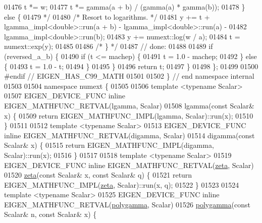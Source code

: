 \begin{DoxyCode}
01476 \textcolor{comment}{      t *= w;}
01477 \textcolor{comment}{      t *= gamma(a + b) / (gamma(a) * gamma(b));}
01478 \textcolor{comment}{    \} else \{}
01479 \textcolor{comment}{    */}
01480     \textcolor{comment}{/* Resort to logarithms.  */}
01481     y += t + lgamma\_impl<double>::run(a + b) - lgamma\_impl<double>::run(a) -
01482          lgamma\_impl<double>::run(b);
01483     y += numext::log(w / a);
01484     t = numext::exp(y);
01485 
01486     \textcolor{comment}{/* \} */}
01487     \textcolor{comment}{// done:}
01488 
01489     \textcolor{keywordflow}{if} (reversed\_a\_b) \{
01490       \textcolor{keywordflow}{if} (t <= machep) \{
01491         t = 1.0 - machep;
01492       \} \textcolor{keywordflow}{else} \{
01493         t = 1.0 - t;
01494       \}
01495     \}
01496     \textcolor{keywordflow}{return} t;
01497   \}
01498 \};
01499 
01500 \textcolor{preprocessor}{#endif  // EIGEN\_HAS\_C99\_MATH}
01501 
01502 \}  \textcolor{comment}{// end namespace internal}
01503 
01504 \textcolor{keyword}{namespace }numext \{
01505 
01506 \textcolor{keyword}{template} <\textcolor{keyword}{typename} Scalar>
01507 EIGEN\_DEVICE\_FUNC \textcolor{keyword}{inline} EIGEN\_MATHFUNC\_RETVAL(lgamma, Scalar)
01508     lgamma(\textcolor{keyword}{const} Scalar& x) \{
01509   \textcolor{keywordflow}{return} EIGEN\_MATHFUNC\_IMPL(lgamma, Scalar)::run(x);
01510 \}
01511 
01512 \textcolor{keyword}{template} <\textcolor{keyword}{typename} Scalar>
01513 EIGEN\_DEVICE\_FUNC \textcolor{keyword}{inline} EIGEN\_MATHFUNC\_RETVAL(digamma, Scalar)
01514     digamma(\textcolor{keyword}{const} Scalar& x) \{
01515   \textcolor{keywordflow}{return} EIGEN\_MATHFUNC\_IMPL(digamma, Scalar)::run(x);
01516 \}
01517 
01518 \textcolor{keyword}{template} <\textcolor{keyword}{typename} Scalar>
01519 EIGEN\_DEVICE\_FUNC \textcolor{keyword}{inline} EIGEN\_MATHFUNC\_RETVAL(\hyperlink{namespace_eigen_af9555e27540da78d2c4bdd17d3b750b1}{zeta}, Scalar)
01520 \hyperlink{namespace_eigen_af9555e27540da78d2c4bdd17d3b750b1}{zeta}(\textcolor{keyword}{const} Scalar& x, \textcolor{keyword}{const} Scalar& q) \{
01521     \textcolor{keywordflow}{return} EIGEN\_MATHFUNC\_IMPL(\hyperlink{namespace_eigen_af9555e27540da78d2c4bdd17d3b750b1}{zeta}, Scalar)::run(x, q);
01522 \}
01523 
01524 \textcolor{keyword}{template} <\textcolor{keyword}{typename} Scalar>
01525 EIGEN\_DEVICE\_FUNC \textcolor{keyword}{inline} EIGEN\_MATHFUNC\_RETVAL(\hyperlink{namespace_eigen_ae3b47a13a0699f5dbaa0623c11333dca}{polygamma}, Scalar)
01526 \hyperlink{namespace_eigen_ae3b47a13a0699f5dbaa0623c11333dca}{polygamma}(\textcolor{keyword}{const} Scalar& n, \textcolor{keyword}{const} Scalar& x) \{

\end{DoxyCode}
